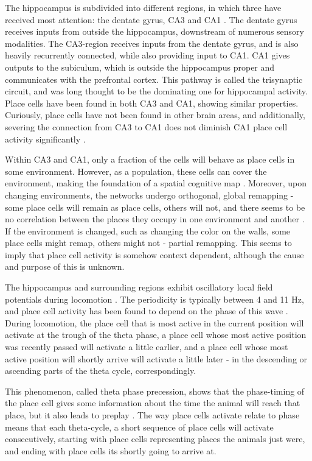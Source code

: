 \documentclass{article}
\begin{document}
    The hippocampus is subdivided into different regions, in which three have received most attention: the dentate gyrus, CA3 and CA1 \parencite{Cherubini2015}. The dentate gyrus receives inputs from outside the hippocampus, downstream of numerous sensory modalities. The CA3-region receives inputs from the dentate gyrus, and is also heavily recurrently connected, while also providing input to CA1. CA1 gives outputs to the subiculum, which is outside the hippocampus proper and communicates with the prefrontal cortex. This pathway is called the trisynaptic circuit, and was long thought to be the dominating one for hippocampal activity. Place cells have been found in both CA3 and CA1, showing similar properties. Curiously, place cells have not been found in other brain areas, and additionally, severing the connection from CA3 to CA1 does not diminish CA1 place cell activity significantly \parencite{Brun2002}.

    Within CA3 and CA1, only a fraction of the cells will behave as place cells in some environment. However, as a population, these cells can cover the environment, making the foundation of a spatial cognitive map \parencite{Wilson1993}. Moreover, upon changing environments, the networks undergo orthogonal, global remapping - some place cells will remain as place cells, others will not, and there seems to be no correlation between the places they occupy in one environment and another \parencite{Muller1987}. If the environment is changed, such as changing the color on the walls, some place cells might remap, others might not - partial remapping. This seems to imply that place cell activity is somehow context dependent, although the cause and purpose of this is unknown.

    The hippocampus and surrounding regions exhibit oscillatory local field potentials during locomotion \parencite{Winson1978}. The periodicity is typically between 4 and 11 Hz, and place cell activity has been found to depend on the phase of this wave \parencite{OKeefe1993,Skaggs1996, Hafting2008}. During locomotion, the place cell that is most active in the current position will activate at the trough of the theta phase, a place cell whose most active position was recently passed will activate a little earlier, and a place cell whose most active position will shortly arrive will activate a little later - in the descending or ascending parts of the theta cycle, correspondingly.

    This phenomenon, called theta phase precession, shows that the phase-timing of the place cell gives some information about the time the animal will reach that place, but it also leads to preplay \parencite{Dragoi2011,Dragoi2013}. The way place cells activate relate to phase means that each theta-cycle, a short sequence of place cells will activate consecutively, starting with place cells representing places the animals just were, and ending with place cells its shortly going to arrive at.
\end{document}
